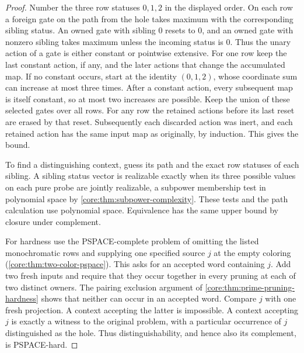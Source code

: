 \begin{proof}
Number the three row statuses $0,1,2$ in the displayed order.
On each row a foreign gate on the path from the hole takes maximum
with the corresponding sibling status. An owned gate with sibling
$0$ resets to $0$, and an owned gate with nonzero sibling takes
maximum unless the incoming status is $0$. Thus the unary action
of a gate is either constant or pointwise extensive. For one row
keep the last constant action, if any, and the later actions that
change the accumulated map. If no constant occurs, start at the
identity $(0,1,2)$, whose coordinate sum can increase at most three
times. After a constant action, every subsequent map is itself
constant, so at most two increases are possible. Keep the union of
these selected gates over all rows. For any row the retained actions
before its last reset are erased by that reset. Subsequently each
discarded action was inert, and each retained action has the same
input map as originally, by induction. This gives the bound.

To find a distinguishing context, guess its path and the exact row
statuses of each sibling. A sibling status vector is realizable
exactly when its three possible values on each pure probe are jointly
realizable, a subpower membership test in polynomial space by
\cref{core:thm:subpower-complexity}. These tests and the path
calculation use polynomial space. Equivalence has the same upper
bound by closure under complement.

For hardness use the PSPACE-complete problem of omitting the listed
monochromatic rows and supplying one specified source $j$ at the
empty coloring (\cref{core:thm:two-color-pspace}). This asks for an
accepted word containing $j$. Add two fresh inputs and require that
they occur together in every pruning at each of two distinct owners.
The pairing exclusion argument of \cref{core:thm:prime-pruning-hardness}
shows that neither can occur in an accepted word. Compare $j$ with
one fresh projection. A context accepting the latter is impossible.
A context accepting $j$ is exactly a witness to the original
problem, with a particular occurrence of $j$ distinguished as the
hole. Thus distinguishability, and hence also its complement, is
PSPACE-hard.
\end{proof}

